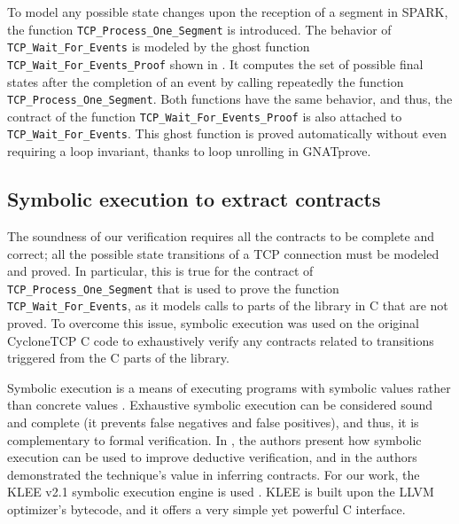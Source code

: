 \documentclass[conference]{IEEEtran}
\def\spark#1{\lstinline[language=Ada]{#1}}
\begin{document}
To model any possible state changes upon the reception of a segment in SPARK, the function \spark{TCP_Process_One_Segment} is introduced.
The behavior of \spark{TCP_Wait_For_Events} is modeled by the ghost function \spark{TCP_Wait_For_Events_Proof} shown in . It computes the set of possible final states after the completion of an event by calling repeatedly the function \spark{TCP_Process_One_Segment}. Both functions have the same behavior, and thus, the contract of the function \spark{TCP_Wait_For_Events_Proof} is also attached to \spark{TCP_Wait_For_Events}. This ghost function is proved automatically without even requiring a loop invariant, thanks to loop unrolling in GNATprove.


\subsection{Symbolic execution to extract contracts}

The soundness of our verification requires all the contracts to be complete and correct; all the possible state transitions of a TCP connection must be modeled and proved.  In particular, this is true for the contract of \spark{TCP_Process_One_Segment} that is used to prove the function \spark{TCP_Wait_For_Events}, as it models calls to parts of the library in C that are not proved. To overcome this issue, symbolic execution was used on the original CycloneTCP C code to exhaustively verify any contracts related to transitions triggered from the C parts of the library.

Symbolic execution is a means of executing programs with symbolic values rather than concrete values \cite{symbolic_exec_survey:2018}. Exhaustive symbolic execution can be considered sound and complete (it prevents false negatives and false positives), and thus, it is complementary to formal verification. In \cite{vanoverberghe2008using}, the authors present how symbolic execution can be used to improve deductive verification, and in \cite{kassios2012comparing} the authors demonstrated the technique's value in inferring contracts. For our work, the KLEE v2.1 symbolic execution engine is used \cite{KLEE}. KLEE is built upon the LLVM optimizer's bytecode, and it offers a very simple yet powerful C interface.
\end{document}
